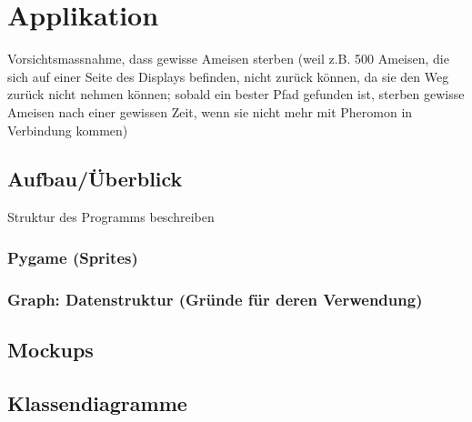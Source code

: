 
\chapter{Applikation}



Vorsichtsmassnahme, dass gewisse Ameisen sterben (weil z.B. 500 Ameisen, die sich auf einer Seite des Displays befinden, nicht zurück können, da sie den Weg zurück nicht nehmen können; sobald ein bester Pfad gefunden ist, sterben gewisse Ameisen nach einer gewissen Zeit, wenn sie nicht mehr mit Pheromon in Verbindung kommen) \\


\section*{Aufbau/Überblick}

Struktur des Programms beschreiben \\


\vspace*{1cm}

\subsection*{Pygame (Sprites)}


\vspace*{1cm}


\subsection*{Graph: Datenstruktur (Gründe für deren Verwendung)}


\vspace*{1cm}


\section{Mockups}


\vspace*{1cm}



\section{Klassendiagramme}


\vspace*{1cm}


